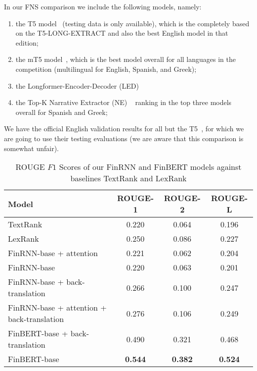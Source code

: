 In our FNS comparison we include the following models, namely:
\begin{enumerate}
    \item the T5 model~\cite{el-haj-etal-2022-financial} (testing data is only available), which is the completely based on the T5-LONG-EXTRACT and also the best English model in that edition;
    \item the mT5 model~\cite{foroutan-etal-2022-multilingual}, which is the best model overall for all languages in the competition (multilingual for English, Spanish, and Greek);
    \item the Longformer-Encoder-Decoder (LED)~\cite{khanna-etal-2022-transformer}
    \item the Top-K Narrative Extractor (NE) ~\cite{shukla-etal-2022-dimsum}  ranking in the top three models overall for Spanish and Greek;
\end{enumerate}
We have the official English validation results for all but the T5~\cite{el-haj-etal-2022-financial}, for which we are going to use their testing evaluations (we are aware that this comparison is somewhat unfair).

\begin{table}[ht]
    \centering
    \begin{tabular}{lccc}
        \toprule
        \textbf{Model} & \textbf{ROUGE-1} & \textbf{ROUGE-2} & \textbf{ROUGE-L} \\
        \midrule
            TextRank ~\cite{mihalcea-tarau-2004-textrank} & 0.220 & 0.064 & 0.196 \\
            LexRank ~\cite{Erkan2004LexRankGC} & 0.250 & 0.086 & 0.227 \\
        \midrule
            FinRNN-base + attention & 0.221 & 0.062 & 0.204 \\
            FinRNN-base & 0.220 & 0.063 & 0.201 \\
            FinRNN-base + back-translation & 0.266 & 0.100 & 0.247 \\
            FinRNN-base + attention + back-translation & 0.276 & 0.106 & 0.249 \\
            FinBERT-base + back-translation & 0.490 & 0.321 & 0.468 \\
            FinBERT-base & \textbf{0.544} & \textbf{0.382} & \textbf{0.524} \\
        \bottomrule
    \end{tabular}\caption{ROUGE $F1$ Scores of our FinRNN and FinBERT models against baselines TextRank and LexRank}
    \label{tab:rouge_performance_validation}
\end{table}

